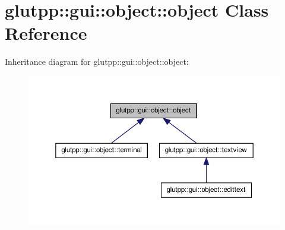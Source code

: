 \hypertarget{classglutpp_1_1gui_1_1object_1_1object}{\section{glutpp\-:\-:gui\-:\-:object\-:\-:object \-Class \-Reference}
\label{classglutpp_1_1gui_1_1object_1_1object}
}


\-Inheritance diagram for glutpp\-:\-:gui\-:\-:object\-:\-:object\-:\nopagebreak
\begin{figure}[H]
\begin{center}
\leavevmode
\includegraphics[width=350pt]{classglutpp_1_1gui_1_1object_1_1object__inherit__graph}
\end{center}
\end{figure}
